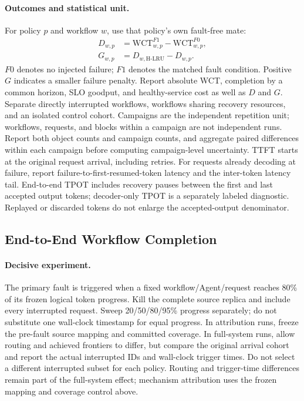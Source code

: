\paragraph{Outcomes and statistical unit.}
For policy $p$ and workflow $w$, use that policy's own fault-free mate:
\begin{equation}
 \begin{aligned}
 D_{w,p}&=\mathrm{WCT}^{F1}_{w,p}-\mathrm{WCT}^{F0}_{w,p},\\
 G_{w,p}&=D_{w,\mathrm{H\mbox{-}LRU}}-D_{w,p}.
 \end{aligned}
 \label{eq:eval-penalty}
\end{equation}
$F0$ denotes no injected failure; $F1$ denotes the matched fault condition.
Positive $G$ indicates a smaller failure penalty. Report absolute WCT,
completion by a common horizon, SLO goodput, and healthy-service cost as
well as $D$ and $G$. Separate directly interrupted workflows, workflows
sharing recovery resources, and an isolated control cohort. Campaigns
are the independent repetition unit; workflows, requests, and blocks
within a campaign are not independent runs. Report both object counts
and campaign counts, and aggregate paired differences within each
campaign before computing campaign-level uncertainty.
TTFT starts at the original request arrival, including retries. For
requests already decoding at failure, report failure-to-first-resumed-token
latency and the inter-token latency tail. End-to-end TPOT includes recovery
pauses between the first and last accepted output tokens; decoder-only
TPOT is a separately labeled diagnostic. Replayed or discarded tokens do
not enlarge the accepted-output denominator.

\subsection{End-to-End Workflow Completion}
\label{sec:eval-workflow}

\paragraph{Decisive experiment.}
The primary fault is triggered when a fixed workflow/Agent/request reaches
80\% of its frozen logical token progress. Kill the complete source
replica and include every interrupted request. Sweep 20/50/80/95\%
progress separately; do not substitute one wall-clock timestamp for
equal progress. In attribution runs, freeze the pre-fault source mapping
and committed coverage. In full-system runs, allow routing and achieved
frontiers to differ, but compare the original arrival cohort and report
the actual interrupted IDs and wall-clock trigger times. Do not select
a different interrupted subset for each policy. Routing and trigger-time
differences remain part of the full-system effect; mechanism attribution
uses the frozen mapping and coverage control above.

